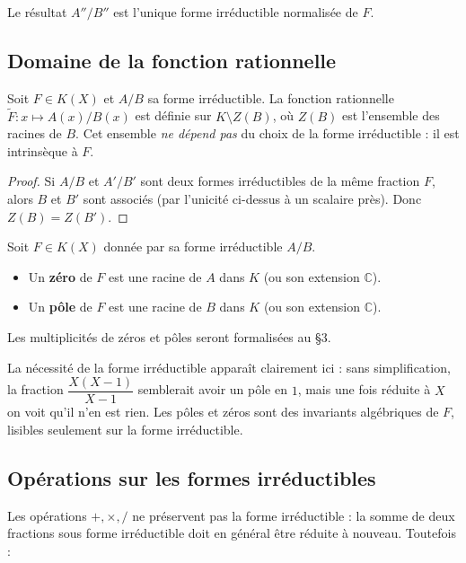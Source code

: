 Le résultat $A''/B''$ est l'unique forme irréductible normalisée de $F$.

\subsection{Domaine de la fonction rationnelle}

\begin{proposition}
Soit $F \in K(X)$ et $A/B$ sa forme irréductible. La fonction rationnelle $\widetilde{F} : x \mapsto A(x)/B(x)$ est définie sur $K \setminus Z(B)$, où $Z(B)$ est l'ensemble des racines de $B$. Cet ensemble \emph{ne dépend pas} du choix de la forme irréductible : il est intrinsèque à $F$.
\end{proposition}

\begin{proof}
Si $A/B$ et $A'/B'$ sont deux formes irréductibles de la même fraction $F$, alors $B$ et $B'$ sont associés (par l'unicité ci-dessus à un scalaire près). Donc $Z(B) = Z(B')$.
\end{proof}

\begin{definition}
Soit $F \in K(X)$ donnée par sa forme irréductible $A/B$.
\begin{itemize}
    \item Un \textbf{zéro} de $F$ est une racine de $A$ dans $K$ (ou son extension $\mathbb{C}$).
    \item Un \textbf{pôle} de $F$ est une racine de $B$ dans $K$ (ou son extension $\mathbb{C}$).
\end{itemize}
Les multiplicités de zéros et pôles seront formalisées au §3.
\end{definition}

\begin{remarque}
La nécessité de la forme irréductible apparaît clairement ici : sans simplification, la fraction $\dfrac{X(X-1)}{X-1}$ semblerait avoir un pôle en $1$, mais une fois réduite à $X$ on voit qu'il n'en est rien. Les pôles et zéros sont des invariants algébriques de $F$, lisibles seulement sur la forme irréductible.
\end{remarque}

\subsection{Opérations sur les formes irréductibles}

Les opérations $+, \times, /$ ne préservent pas la forme irréductible : la somme de deux fractions sous forme irréductible doit en général être réduite à nouveau. Toutefois :

